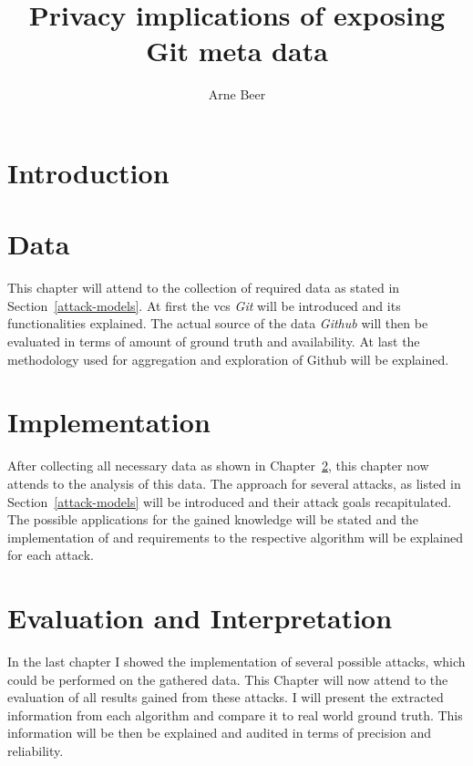 \documentclass{thesis}
\title{Privacy implications of exposing Git meta data}
\author{Arne Beer}
\begin{document}

\cleardoublepage{}


\clearpage



{\small \tableofcontents}



\chapter{Introduction}




\chapter{Data}\label{data}
This chapter will attend to the collection of required data as stated in Section~\ref{attack-models}.
At first the \ac{vcs} \emph{Git} will be introduced and its functionalities explained.
The actual source of the data \emph{Github} will then be evaluated in terms of amount of ground truth and availability.
At last the methodology used for aggregation and exploration of Github will be explained.








\chapter{Implementation}\label{implementation}
After collecting all necessary data as shown in Chapter~\ref{data}, this chapter now attends to the analysis of this data.
The approach for several attacks, as listed in Section~\ref{attack-models} will be introduced and their attack goals recapitulated.
The possible applications for the gained knowledge will be stated and the implementation of and requirements to the respective algorithm will be explained for each attack.







\chapter{Evaluation and Interpretation}\label{evaluation}
In the last chapter I showed the implementation of several possible attacks, which could be performed on the gathered data.
This Chapter will now attend to the evaluation of all results gained from these attacks.
I will present the extracted information from each algorithm and compare it to real world ground truth.
This information will be then be explained and audited in terms of precision and reliability.
\end{document}
